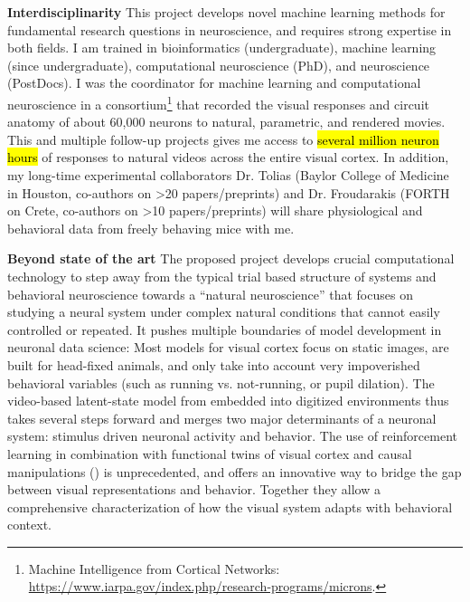 \documentclass[COG,11pt]{ercgrant}
\begin{document}
\textbf{Interdisciplinarity} This project develops novel machine learning methods for fundamental research questions in neuroscience, and requires strong expertise in both fields. 
I am trained in bioinformatics (undergraduate), machine learning (since undergraduate), computational neuroscience (PhD), and neuroscience (PostDocs). 
I was the coordinator for machine learning and computational neuroscience in a consortium\footnote{Machine Intelligence from Cortical Networks: \url{https://www.iarpa.gov/index.php/research-programs/microns}.} that recorded the visual responses and circuit anatomy of about 60,000 neurons to natural, parametric, and rendered movies. This and multiple follow-up projects gives me access to \hl{several million neuron hours} of responses to natural videos across the entire visual cortex. In addition, my long-time experimental collaborators Dr. Tolias (Baylor College of Medicine in Houston, co-authors on >20  papers/preprints) and Dr. Froudarakis (FORTH on Crete, co-authors on >10 papers/preprints) will share physiological and behavioral data from freely behaving mice with me. 


\textbf{Beyond state of the art} 
The proposed project develops crucial computational technology to step away from the typical trial based structure of systems and behavioral neuroscience towards a ``natural neuroscience'' that focuses on studying a neural system under complex natural conditions that cannot easily controlled or repeated. 
It pushes multiple boundaries of model development in neuronal data science: Most models for visual cortex focus on static images, are built for head-fixed animals, and only take into account very impoverished behavioral variables (such as running vs. not-running, or pupil dilation). The video-based latent-state model from  embedded into digitized environments 
thus takes several steps forward and merges two major determinants of a neuronal system: stimulus driven neuronal activity and behavior.  The use of reinforcement learning in combination with functional twins of visual cortex and causal manipulations () is unprecedented, and offers an innovative way to bridge the gap between visual representations and behavior.  Together they allow a comprehensive characterization of how the visual system adapts with behavioral context. 
\end{document}
